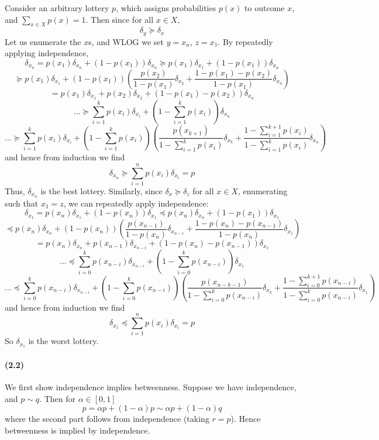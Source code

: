 \documentclass[10pt,letter]{article}
\begin{document}
Consider an arbitrary lottery $p$, which assigns probabilities $p(x)$ to outcome $x$, and $\sum_{x \in X} p(x) = 1$. Then since for all $x \in X$,
\[ \delta_y \succeq \delta_x \]
Let us enumerate the $x$s, and WLOG we set $y = x_n$, $z = x_1$. By repeatedly applying independence,
\[ \delta_{x_n} = p(x_1) \delta_{x_n} + (1-p(x_1))\delta_{x_n}  \succeq  p(x_1) \delta_{x_1} + (1-p(x_1))\delta_{x_n}  \]
\[ \succeq p(x_1) \delta_{x_1} + (1-p(x_1))\left( \frac{p(x_2)}{1-p(x_1)} \delta_{x_2} + \frac{1 - p(x_1) - p(x_2)}{1-p(x_1)}\delta_{x_n} \right)  \]
\[ = p(x_1) \delta_{x_1} + p(x_2) \delta_{x_2} +  (1 - p(x_1) - p(x_2))\delta_{x_n} \]
\[ ... \succeq \sum_{i=1}^k p(x_i)\delta_{x_i} + \left(1 - \sum_{i=1}^k p(x_i)\right) \delta_{x_n} \]
\[ ... \succeq \sum_{i=1}^k p(x_i)\delta_{x_i} + \left(1 - \sum_{i=1}^k p(x_i)\right) \left( \frac{p(x_{k+1})}{1 - \sum_{i=1}^k p(x_i)} \delta_{x_k} + \frac{1 - \sum_{i=1}^{k+1} p(x_i)}{1 - \sum_{i=1}^k p(x_i)} \delta_{x_n} \right) \]
and hence from induction we find
\[ \delta_{x_n} \succeq \sum_{i=1}^n p(x_i)\delta_{x_i} = p \]
Thus, $\delta_{x_n}$ is the best lottery. Similarly, since $\delta_x \succeq \delta_z$ for all $x \in X$, enumerating such that $x_1 = z$, we can repeatedly apply independence:
\[ \delta_{x_1} = p(x_n) \delta_{x_1} + (1-p(x_n))\delta_{x_1}  \preceq  p(x_n) \delta_{x_n} + (1-p(x_1))\delta_{x_1}  \]
\[ \preceq p(x_n) \delta_{x_n} + (1-p(x_n))\left( \frac{p(x_{n-1})}{1-p(x_n)} \delta_{x_{n-1}} + \frac{1 - p(x_n) - p(x_{n-1})}{1-p(x_n)}\delta_{x_1} \right)  \]
\[ = p(x_n) \delta_{x_n} + p(x_{n-1}) \delta_{x_{n-1}} +  (1 - p(x_n) - p(x_{n-1}))\delta_{x_1} \]
\[ ... \preceq \sum_{i=0}^k p(x_{n-i})\delta_{x_{n-i}} + \left(1 - \sum_{i=0}^k p(x_{n-i})\right) \delta_{x_1} \]
\[ ... \preceq \sum_{i=0}^k p(x_{n-i})\delta_{x_{n-i}} + \left(1 - \sum_{i=0}^k p(x_{n-i})\right) \left( \frac{p(x_{n-k-1})}{1 - \sum_{i=0}^k p(x_{n-i})} \delta_{x_k} + \frac{1 - \sum_{i=0}^{k+1} p(x_{n-i})}{1 - \sum_{i=0}^k p(x_{n-i})} \delta_{x_1} \right) \]
and hence from induction we find
\[ \delta_{x_1} \preceq \sum_{i=1}^n p(x_i)\delta_{x_i} = p \]
So $\delta_{x_1}$ is the worst lottery.

\paragraph{(2.2)}
We first show independence implies betweenness. Suppose we have independence, and $p \sim q$. Then for $\alpha \in [0,1]$
\[ p = \alpha p + (1-\alpha) p \sim \alpha p + (1-\alpha) q  \]
where the second part follows from independence (taking $r = p$). Hence betweenness is implied by independence.
\end{document}
